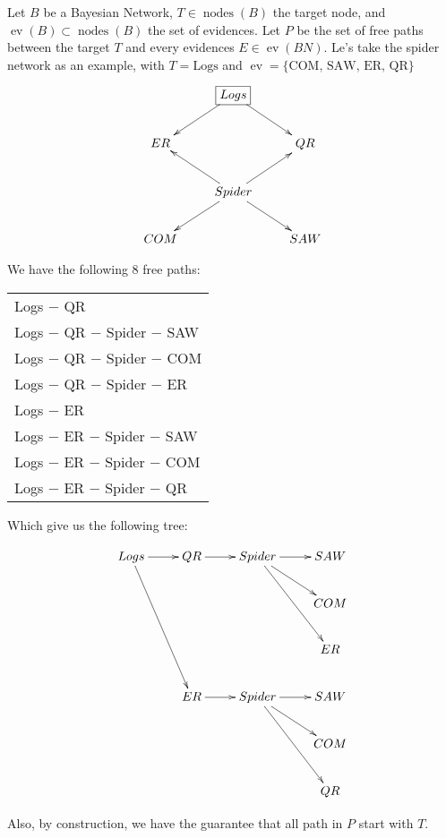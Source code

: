 \documentclass[a4paper]{article}
\DeclareMathOperator{\nodes}{nodes}
\DeclareMathOperator{\evidences}{ev}
\begin{document}
Let $B$ be a Bayesian Network, $T\in\nodes(B)$ the target node,
and $\evidences(B)\subset\nodes(B)$ the set of evidences.
Let $P$ be the set of free paths between the target $T$ and every evidences $E\in\evidences(BN)$.
Le's take the spider network as an example, with $T = \text{Logs}$ and $\evidences = \{\text{COM, SAW, ER, QR}\}$

\[
  \xymatrix{%
        &*+[F]{Logs}\ar[dl]\ar[dr]                &       \\
    ER  &                                         & QR    \\
        & Spider\ar[ul]\ar[ur]\ar[dl]\ar[dr]      &       \\
    COM &                                         & SAW   \\
  }
\]

We have the following 8 free paths:

\begin{tabular}{l}
  Logs $-$ QR \\
  Logs $-$ QR $-$ Spider $-$ SAW \\
  Logs $-$ QR $-$ Spider $-$ COM \\
  Logs $-$ QR $-$ Spider $-$ ER  \\
  Logs $-$ ER \\
  Logs $-$ ER $-$ Spider $-$ SAW \\
  Logs $-$ ER $-$ Spider $-$ COM \\
  Logs $-$ ER $-$ Spider $-$ QR  \\
\end{tabular}

Which give us the following tree:

\[
  \xymatrix{%
    Logs\ar[r]\ar[dddr] & QR\ar[r]  & Spider \ar[r]\ar[dr]\ar[ddr]  & SAW \\
                        &           &                               & COM \\
                        &           &                               & ER  \\
                        & ER\ar[r]  & Spider \ar[r]\ar[dr]\ar[ddr]  & SAW \\
                        &           &                               & COM \\
                        &           &                               & QR  \\
  }
\]

Also, by construction, we have the guarantee that all path in $P$ start with $T$.
\end{document}
